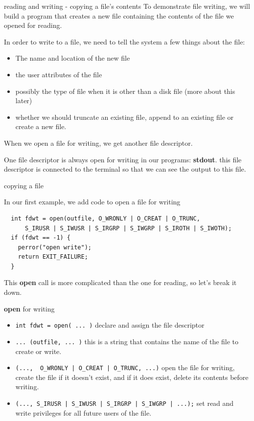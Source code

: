 \documentclass[10pt]{beamer}
\begin{document}
\begin{frame}[fragile]{reading and writing - copying a file's contents}
To demonstrate file writing, we will build a program that creates a new file containing the contents of the file we opened for reading.

In order to write to a file, we need to tell the system a few things about the file:

\begin{itemize}
\item The name and location of the new file
\item the user attributes of the file
\item possibly the type of file when it is other than a disk file (more about this later)
\item whether we should truncate an existing file, append to an existing file or create a new file.
\end{itemize}

When we open a file for writing, we get another file descriptor.

One file descriptor is always open for writing in our programs: \textbf{stdout}.  this file descriptor is connected to the terminal so that we can see the output to this file.

\end{frame}
\begin{frame}[fragile]{copying a file}

In our first example, we add code to open a file for writing

\begin{verbatim}
  int fdwt = open(outfile, O_WRONLY | O_CREAT | O_TRUNC,
      S_IRUSR | S_IWUSR | S_IRGRP | S_IWGRP | S_IROTH | S_IWOTH);
  if (fdwt == -1) {
    perror("open write");
    return EXIT_FAILURE;
  }
\end{verbatim}

This \textbf{open} call is more complicated than the one for reading, so let's break it down.

\end{frame}
\begin{frame}[fragile]{\textbf{open} for writing}

\begin{itemize}
\item \lstinline{int fdwt = open( ... )} declare and assign the file descriptor
\item \lstinline{... (outfile, ... )} this is a string that contains the name of the file to create or write.
\item \lstinline{(...,  O_WRONLY | O_CREAT | O_TRUNC, ...)} open the file for writing, create the file if it doesn't exist, and if it does exist, delete its contents before writing.
\item \lstinline{(..., S_IRUSR | S_IWUSR | S_IRGRP | S_IWGRP | ...);} set read and write privileges for all future users of the file.
\end{itemize}

\end{frame}
\end{document}

